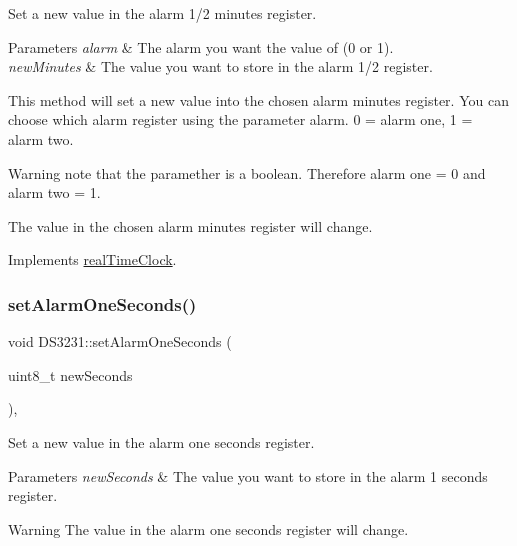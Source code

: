Set a new value in the alarm 1/2 minutes register. 


\begin{DoxyParams}{Parameters}
{\em alarm} & The alarm you want the value of (0 or 1). \\
\hline
{\em new\+Minutes} & The value you want to store in the alarm 1/2 register.\\
\hline
\end{DoxyParams}
This method will set a new value into the chosen alarm minutes register. You can choose which alarm register using the parameter alarm. 0 = alarm one, 1 = alarm two. \begin{DoxyWarning}{Warning}
note that the paramether is a boolean. Therefore alarm one = 0 and alarm two = 1. 

The value in the chosen alarm minutes register will change. 
\end{DoxyWarning}


Implements \mbox{\hyperlink{classreal_time_clock_a53ffba88cd87d05af58288fb4fc589b5}{real\+Time\+Clock}}.

\mbox{\label{class_d_s3231_ae294f3c8c8634a058846cf9864ccc5c8}} 
\subsubsection{\texorpdfstring{set\+Alarm\+One\+Seconds()}{setAlarmOneSeconds()}}
{\footnotesize\ttfamily void D\+S3231\+::set\+Alarm\+One\+Seconds (\begin{DoxyParamCaption}\item[{uint8\+\_\+t}]{new\+Seconds }\end{DoxyParamCaption})\hspace{0.3cm}{\ttfamily [override]}, {\ttfamily [virtual]}}



Set a new value in the alarm one seconds register. 


\begin{DoxyParams}{Parameters}
{\em new\+Seconds} & The value you want to store in the alarm 1 seconds register. \\
\hline
\end{DoxyParams}
\begin{DoxyWarning}{Warning}
The value in the alarm one seconds register will change. 
\end{DoxyWarning}


